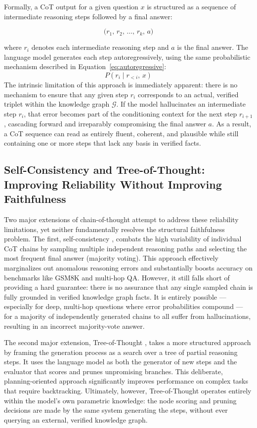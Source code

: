 Formally, a CoT output for a given question $x$ is structured as a sequence of intermediate reasoning steps followed by a final answer:

\begin{equation}
    \bigl(r_1,\, r_2,\, \ldots,\, r_k,\, a\bigr)
    \label{eq:cot}
\end{equation}

where $r_i$ denotes each intermediate reasoning step and $a$ is the final answer. The language model generates each step autoregressively, using the same probabilistic mechanism described in Equation~\eqref{eq:autoregressive}:
\[
    P(r_i \mid r_{<i},\, x)
\]
The intrinsic limitation of this approach is immediately apparent: there is no mechanism to ensure that any given step $r_i$ corresponds to an actual, verified triplet within the knowledge graph $\mathcal{G}$. If the model hallucinates an intermediate step $r_i$, that error becomes part of the conditioning context for the next step $r_{i+1}$, cascading forward and irreparably compromising the final answer $a$. As a result, a CoT sequence can read as entirely fluent, coherent, and plausible while still containing one or more steps that lack any basis in verified facts.

\subsection{Self-Consistency and Tree-of-Thought: Improving Reliability Without
    Improving Faithfulness}

Two major extensions of chain-of-thought attempt to address these reliability limitations, yet neither fundamentally resolves the structural faithfulness problem. The first, self-consistency \citep{wang2023selfconsistency}, combats the high variability of individual CoT chains by sampling multiple independent reasoning paths and selecting the most frequent final answer (majority voting). This approach effectively marginalizes out anomalous reasoning errors and substantially boosts accuracy on benchmarks like GSM8K and multi-hop QA. However, it still falls short of providing a hard guarantee: there is no assurance that any single sampled chain is fully grounded in verified knowledge graph facts. It is entirely possible — especially for deep, multi-hop questions where error probabilities compound — for a majority of independently generated chains to all suffer from hallucinations, resulting in an incorrect majority-vote answer.

The second major extension, Tree-of-Thought \citep{yao2023tree}, takes a more structured approach by framing the generation process as a search over a tree of partial reasoning steps. It uses the language model as both the generator of new steps and the evaluator that scores and prunes unpromising branches. This deliberate, planning-oriented approach significantly improves performance on complex tasks that require backtracking. Ultimately, however, Tree-of-Thought operates entirely within the model's own parametric knowledge: the node scoring and pruning decisions are made by the same system generating the steps, without ever querying an external, verified knowledge graph.

